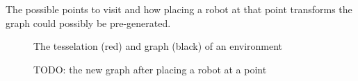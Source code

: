 The possible points to visit and how placing a robot at that point transforms the graph could possibly be pre-generated.

\begin{figure}[h!t]
	\caption{The tesselation (red) and graph (black) of an environment}
	\label{searchDestroy}
\end{figure}

\begin{figure}[h!t]
	\caption{TODO: the new graph after placing a robot at a point}
	\label{searchDestroy2}
\end{figure}